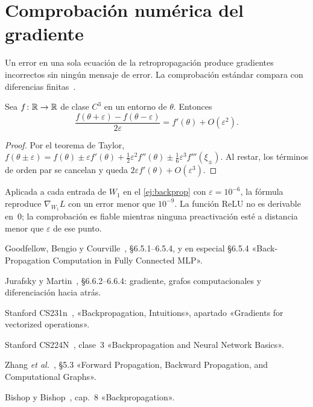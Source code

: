 \section{Comprobación numérica del gradiente}

Un error en una sola ecuación de la retropropagación produce gradientes incorrectos sin ningún mensaje de error. La comprobación estándar compara con diferencias finitas~\cite{cs231n}.

\begin{proposicion}\label{prop:centradas}
Sea $f\colon\mathbb{R}\to\mathbb{R}$ de clase $C^{3}$ en un entorno de $\theta$. Entonces
\[
\frac{f(\theta+\varepsilon)-f(\theta-\varepsilon)}{2\varepsilon}=f'(\theta)+O(\varepsilon^{2}).
\]
\end{proposicion}

\begin{proof}
Por el teorema de Taylor, $f(\theta\pm\varepsilon)=f(\theta)\pm\varepsilon f'(\theta)+\tfrac12\varepsilon^{2}f''(\theta)\pm\tfrac16\varepsilon^{3}f'''(\xi_\pm)$. Al restar, los términos de orden par se cancelan y queda $2\varepsilon f'(\theta)+O(\varepsilon^{3})$.
\end{proof}

Aplicada a cada entrada de $W_1$ en el \cref{ej:backprop} con $\varepsilon=10^{-6}$, la fórmula reproduce $\nabla_{\!W_1}L$ con un error menor que $10^{-9}$. La función ReLU no es derivable en~0; la comprobación es fiable mientras ninguna preactivación esté a distancia menor que $\varepsilon$ de ese punto.

\begin{lecturas}
\item Goodfellow, Bengio y Courville~\cite{gbc}, §6.5.1--6.5.4, y en especial §6.5.4 «Back-Propagation Computation in Fully Connected MLP».
\item Jurafsky y Martin~\cite{jm3}, §6.6.2--6.6.4: gradiente, grafos computacionales y diferenciación hacia atrás.
\item Stanford CS231n~\cite{cs231n}, «Backpropagation, Intuitions», apartado «Gradients for vectorized operations».
\item Stanford CS224N~\cite{cs224n}, clase~3 «Backpropagation and Neural Network Basics».
\item Zhang \emph{et al.}~\cite{d2l}, §5.3 «Forward Propagation, Backward Propagation, and Computational Graphs».
\item Bishop y Bishop~\cite{bishopdl}, cap.~8 «Backpropagation».
\end{lecturas}

